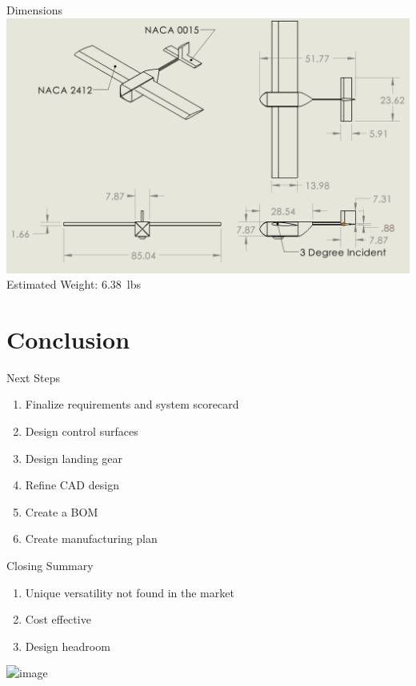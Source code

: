 \documentclass{beamer}
\newcommand{\setpresentername}[1]{\renewcommand{\presentername}{#1}}
\newcommand{\setpresentertitle}[1]{\renewcommand{\presentertitle}{#1}}
\newcommand{\presentername}{}
\newcommand{\presentertitle}{}
\begin{document}
    \begin{frame}{Dimensions}
        \centering
        \includegraphics[width=\textwidth]{figures/current/Current Dimensions.png}
        \vspace{0.5em} %
        Estimated Weight: \qty{6.38}{lbs}
    \end{frame}

    \section{Conclusion}

    \setpresentername{Matthew Mehrtens}
    \setpresentertitle{Project Manager}

    \begin{frame}{Next Steps}
        \begin{enumerate}
            \item Finalize requirements and system scorecard
            \item Design control surfaces
            \item Design landing gear
            \item Refine CAD design
            \item Create a BOM
            \item Create manufacturing plan
        \end{enumerate}
    \end{frame}

    \begin{frame}{Closing Summary}
        \begin{enumerate}
            \item<2-> Unique versatility not found in the market
            \item<3-> Cost effective
            \item<4-> Design headroom
        \end{enumerate}
        \vspace{10pt}
        \centering
        \includegraphics<1->[width=\textwidth]{figures/current/Current Iso.png}
    \end{frame}
\end{document}
